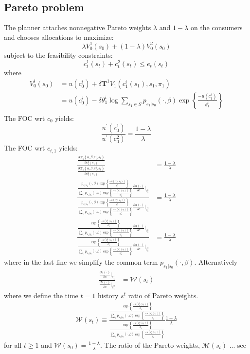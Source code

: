 \documentclass[a4paper,12pt]{article}
\begin{document}
\subsection{Pareto problem}
The planner attaches nonnegative Pareto weights $\lambda$ and $1-\lambda$  on the consumers and chooses allocations to maximize:
\[
\lambda V_0^1(s_0)+ (1-\lambda) V_0^2(s_0)
\]
subject to the feasibility constraints:
\[
c_t^1(s_t) + c_t^2(s_t) \le e_t(s_t)
\]
where 
\begin{align*}
V_0^i(s_0) &= u(c_0^i) + \delta\mathbf{T}^1 V_1(c_1^i(s_1), s_1, \pi_1) \\
           &= u(c_0^i) - \delta \theta_1^i \log \sum_{s_1 \in S}{p_{s_1|s_0}(\cdot,\beta) \exp\left\{{\frac{-u(c_1^i)}{\theta_1^i}}\right\}}\\
\end{align*}
The FOC wrt $c_0$ yields:
\[
\frac{u^{\prime}(c_0^1)}{u^{\prime}(c_0^2)} = \frac{1-\lambda}{\lambda}
\]
The FOC wrt $c_{i,1}$ yields:
\begin{align*}
\frac{\frac{\partial \mathbf{T}_1(\alpha, \beta, c_1^1, s_0)}{\partial c_1^1(s_1)}}{\frac{\partial \mathbf{T}_1(\alpha, \beta, c_1^2, s_0)}{\partial c_2^2(s_1)}} &= \frac{1-\lambda}{\lambda}\\
\frac{
\frac{p_{s_1|s_0}(\cdot,\beta) \exp\left\{{\frac{-u(c_1^1(s_1))}{\theta_1^i}}\right\}}{\sum_{s_1}{p_{s_1|s_0}(\cdot,\beta) \exp\left\{{\frac{-u(c_1^1(s_1))}{\theta_1^i}}\right\}}}\frac{\partial u(\cdot)}{\partial c}\Big |_{c_1^1}
}
{
\frac{p_{s_1|s_0}(\cdot,\beta) \exp\left\{{\frac{-u(c_1^2(s_1))}{\theta_1^i}}\right\}}{\sum_{s_1}{p_{s_1|s_0}(\cdot,\beta) \exp\left\{{\frac{-u(c_1^2(s_1))}{\theta_1^i}}\right\}}}\frac{\partial u(\cdot)}{\partial c}\Big |_{c_1^2}
} &= \frac{1-\lambda}{\lambda} \\
\frac{
\frac{\exp\left\{{\frac{-u(c_1^1(s_1))}{\theta_1^i}}\right\}}{\sum_{s_1}{p_{s_1|s_0}(\cdot,\beta) \exp\left\{{\frac{-u(c_1^1(s_1))}{\theta_1^i}}\right\}}}\frac{\partial u(\cdot)}{\partial c}\Big |_{c_1^1}
}
{
\frac{\exp\left\{{\frac{-u(c_1^2(s_1))}{\theta_1^i}}\right\}}{\sum_{s_1}{p_{s_1|s_0}(\cdot,\beta) \exp\left\{{\frac{-u(c_1^2(s_1))}{\theta_1^i}}\right\}}}\frac{\partial u(\cdot)}{\partial c}\Big |_{c_1^2}
} &= \frac{1-\lambda}{\lambda}
\end{align*}
where in the last line we simplify the common term $p_{s_1|s_0}(\cdot,\beta)$.
Alternatively
\begin{align*}
\frac{\frac{\partial u(\cdot)}{\partial c}\Big |_{c_1^1}}{\frac{\partial u(\cdot)}{\partial c}\Big |_{c_1^2}} &= \mathcal{W}(s_t)
\end{align*}
where we define the time $t=1$ history $s^t$ ratio of Pareto weights.
\begin{align*}
\mathcal{W}(s_t) \equiv
\frac{
\frac{\exp\left\{{\frac{-u(c_1^2(s_1))}{\theta_1^i}}\right\}}{\sum_{s_1}{p_{s_1|s_0}(\cdot,\beta) \exp\left\{{\frac{-u(c_1^2(s_1))}{\theta_1^i}}\right\}}}
}
{
\frac{\exp\left\{{\frac{-u(c_1^1(s_1))}{\theta_1^i}}\right\}}{\sum_{s_1}{p_{s_1|s_0}(\cdot,\beta) \exp\left\{{\frac{-u(c_1^1(s_1))}{\theta_1^i}}\right\}}}
}\frac{1-\lambda}{\lambda}
\end{align*}
for all $t \ge 1$ and $\mathcal{W}(s_0) = \frac{1-\lambda}{\lambda}$. The ratio of the Pareto weights, $\mathcal{M}(s_t)$ ... see \cite{Anderson2005}
\end{document}

